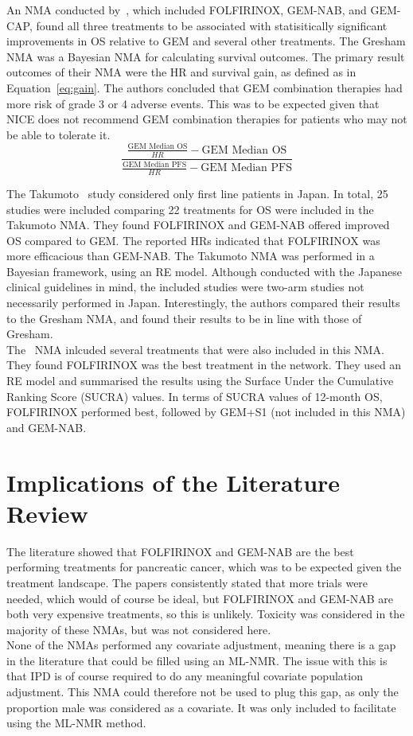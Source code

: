 An NMA conducted by~\cite{gresham2014}, which included FOLFIRINOX, GEM-NAB, and GEM-CAP, found all three treatments to be associated with statisitically significant improvements in OS relative to GEM and several other treatments. The Gresham NMA was a Bayesian NMA for calculating survival outcomes. The primary result outcomes of their NMA were the HR and survival gain, as defined as in Equation~\ref{eq:gain}. The authors concluded that GEM combination therapies had more risk of grade 3 or 4 adverse events. This was to be expected given that NICE does not recommend GEM combination therapies for patients who may not be able to tolerate it. \\

\begin{equation}
    \frac{\frac{\text{GEM Median OS}}{HR}-\text{GEM Median OS}}{\frac{\text{GEM Median PFS}}{HR}-\text{GEM Median PFS}}
    \label{eq:gain}
\end{equation}

The Takumoto~\cite{takumoto} study considered only first line patients in Japan. In total, 25 studies were included comparing 22 treatments for OS were included in the Takumoto NMA. They found FOLFIRINOX and GEM-NAB offered improved OS compared to GEM. The reported HRs indicated that FOLFIRINOX was more efficacious than GEM-NAB. The Takumoto NMA was performed in a Bayesian framework, using an RE model. Although conducted with the Japanese clinical guidelines in mind, the included studies were two-arm studies not necessarily performed in Japan. Interestingly, the authors compared their results to the Gresham NMA, and found their results to be in line with those of Gresham. \\

The~\cite{zhang} NMA inlcuded several treatments that were also included in this NMA. They found FOLFIRINOX was the best treatment in the network. They used an RE model and summarised the results using the Surface Under the Cumulative Ranking Score (SUCRA) values. In terms of SUCRA values of 12-month OS, FOLFIRINOX performed best, followed by GEM+S1 (not included in this NMA) and GEM-NAB. 

\section{Implications of the Literature Review}
The literature showed that FOLFIRINOX and GEM-NAB are the best performing treatments for pancreatic cancer, which was to be expected given the treatment landscape. The papers consistently stated that more trials were needed, which would of course be ideal, but FOLFIRINOX and GEM-NAB are both very expensive treatments, so this is unlikely. Toxicity was considered in the majority of these NMAs, but was not considered here. \\

None of the NMAs performed any covariate adjustment, meaning there is a gap in the literature that could be filled using an ML-NMR. The issue with this is that IPD is of course required to do any meaningful covariate population adjustment. This NMA could therefore not be used to plug this gap, as only the proportion male was considered as a covariate. It was only included to facilitate using the ML-NMR method.  \\
